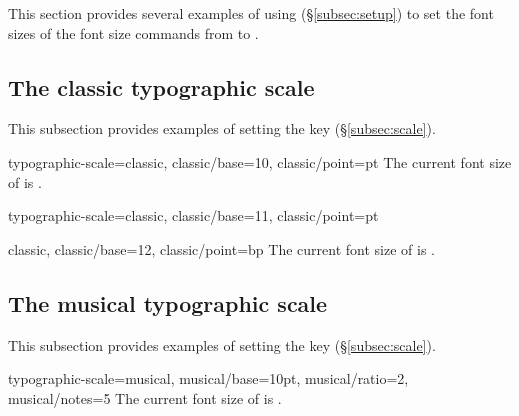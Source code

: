 \documentclass{beerydoc}
\begin{document}
This section provides several examples of using 
(\S\ref{subsec:setup}) to set the font sizes of the font size commands from
 to .

\subsection{The classic typographic scale}
\label{subsec:exclassic}

This subsection provides examples of setting the key
 (\S\ref{subsec:scale}).

\begin{codedemo}
  \begingroup
    \fontscalesetup
      {
        typographic-scale=classic,
        classic/base=10,
        classic/point=pt
      }%
    \printsampletext
      {%
        The current font size of \printfontsizecommand{} is
        \the\currentfontsize.
      }
  \endgroup
\end{codedemo}
\clearpage

\begin{codedemo}
  \begingroup
    \fontscalesetup
      {
        typographic-scale=classic,
        classic/base=11,
        classic/point=pt
      }%
  \endgroup
\end{codedemo}
\clearpage

\begin{codedemo}
  \begingroup
    \fontscalesetup
      {
        classic,
        classic/base=12,
        classic/point=bp
      }%
    \printsampletext
      {%
        The current font size of \printfontsizecommand{} is
        \the\currentfontsize.
      }
  \endgroup
\end{codedemo}
\clearpage

\subsection{The musical typographic scale}
\label{subsec:exmusical}

This subsection provides examples of setting the key
 (\S\ref{subsec:scale}).

\begin{codedemo}
  \begingroup
    \fontscalesetup
      {
        typographic-scale=musical,
        musical/base=10pt,
        musical/ratio=2,
        musical/notes=5
      }%
    \printsampletext
      {%
        The current font size of \printfontsizecommand{} is
        \the\currentfontsize.
      }
  \endgroup
\end{codedemo}
\clearpage
\end{document}
